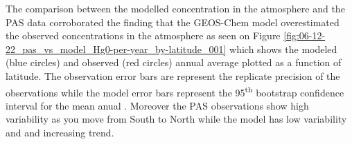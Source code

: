 \begin{table}[H]
\label{tab:modelvsobs metrics}

\centering
{}

\end{table}
\begin{flushleft}
 
\end{flushleft}


\begin{flushleft}
 The comparison between the modelled concentration in the atmosphere and the PAS data corroborated the finding that the GEOS-Chem model overestimated the observed concentrations in the atmosphere as seen on Figure \ref{fig:06-12-22_pas_vs_model_Hg0-per-year_by-latitude_001} which shows the modeled (blue circles) and observed (red circles) annual average \hg plotted as a function of latitude. The observation error bars are represent the replicate precision of the observations while the model error bars represent the 95\textsuperscript{th} bootstrap confidence interval for the mean anual \hg. Moreover the PAS observations show high variability as you move from South to North while the model has low variability and and increasing trend.  
\end{flushleft}

